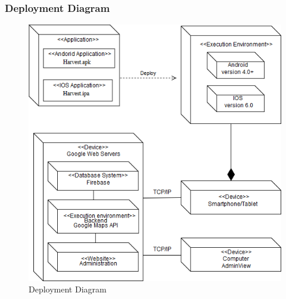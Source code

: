 \documentclass[11pt]{article}
\begin{document}
\subsubsection{Deployment Diagram}
\begin{figure}[h]
 \centering
 \includegraphics[width=12cm, keepaspectratio]{deployment.png}
 \caption{Deployment Diagram}
 \label{DeploymentDiagram}
\end{figure}
\end{document}
